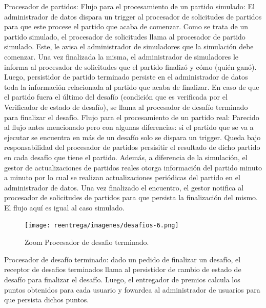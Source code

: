 Procesador de partidos:
Flujo para el procesamiento de un partido simulado: El administrador de datos dispara un trigger al procesador de solicitudes de partidos para que este procese el partido
que acaba de comenzar. Como se trata de un partido simulado, el procesador de solicitudes llama al procesador de partido simulado. Este, le avisa el administrador de simuladores que la simulación debe comenzar. Una vez finalizada la misma, el administrador de simuladores le informa al procesador de solicitudes que el partido finalizó y cómo (quién ganó). Luego, persistidor de partido terminado persiste en el administrador de datos toda la información relacionada al partido que acaba de finalizar.
En caso de que el partido fuera el último del desafío (condición que es verificada por el Verificador de estado de desafío), se llama al procesador de desafío terminado para finalizar el desafío.
Flujo para el procesamiento de un partido real: Parecido al flujo antes mencionado pero con algunas diferencias: si el partido que se va a ejecutar se encuentra en más de un desafío solo se dispara un trigger. Queda bajo responsabilidad del procesador de partidos persisitir el resultado de dicho partido en cada desafío que tiene el partido. Además, a diferencia de la simulación, el gestor de actualizaciones de partidos reales otorga información del partido minuto a minuto por lo cual se realizan actualizaciones periódicas del partido en el administrador de datos. Una vez finalizado el encuentro, el gestor notifica al procesador de solicitudes de partidos para que persista la finalización del mismo. El flujo aquí es igual al caso simulado.

\begin{figure}[H]
  \centering
  \texttt{[image: reentrega/imagenes/desafios-6.png]}
  \caption{Zoom Procesador de desafio terminado.}
\end{figure}

Procesador de desafío terminado: dado un pedido de finalizar un desafío, el receptor de desafios terminados llama al persistidor de cambio de estado de desafío para finalizar el desafío.
Luego, el entregador de premios calcula los puntos obtenidos para cada usuario y fowardea al administrador de usuarios para que persista dichos puntos.
